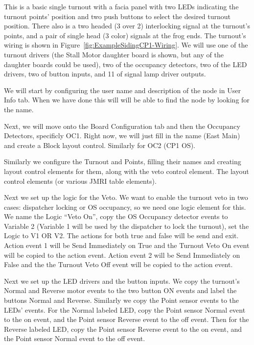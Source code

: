 This is a basic single turnout with a facia panel with two LEDs indicating the
turnout points' position and two push buttons to select the desired turnout
position. There also is a two headed (3 over 2) interlocking signal at the
turnout's points, and a pair of single head (3 color) signals at the frog
ends. The turnout's wiring is shown in 
Figure~\ref{fig:ExampleSidingCP1-Wiring}. We will use one of the turnout 
drivers (the Stall Motor daughter board is shown, but any of the daughter 
boards could be used), two of the occupancy detectors, two of the LED drivers, 
two of button inputs, and 11 of signal lamp driver outputs.

We will start by configuring the user name and description of the node in User 
Info tab.  When we have done this will will be able to find the node by 
looking for the name.  

Next, we will move onto the Board Configuration tab and then the Occupancy
Detectors, specificly OC1. Right now, we will just fill in the name (East
Main) and create a Block layout control. Similarly for OC2 (CP1 OS).

Similarly we configure the Turnout and Points, filling their names and
creating layout control elements for them, along with the veto control
element. The layout control elements (or various JMRI table elements). 

Next we set up the logic for the Veto. We want to enable the turnout veto in
two cases: dispatcher locking or OS occupancy, so we need one logic element
for this. We name the Logic ``Veto On'', copy the OS Occupancy detector events
to Variable 2 (Variable 1 will be used by the dispatcher to lock the turnout),
set the Logic to V1 OR V2. The actions for both true and false will be send
and exit. Action event 1 will be Send Immediately on True and the Turnout Veto
On event will be copied to the action event. Action event 2 will be Send
Immediately on False and the the Turnout Veto Off event will be copied to the
action event.

Next we set up the LED drivers and the button inputs. We copy the turnout's
Normal and Reverse motor events to the two button ON events and label the
buttons Normal and Reverse. Similarly we copy the Point sensor events to the
LEDs' events. For the Normal labeled LED, copy the Point sensor Normal event
to the on event, and the Point sensor Reverse event to the off event. Then for
the Reverse labeled LED, copy the Point sensor Reverse event to the on event, 
and the Point sensor Normal event to the off event.

